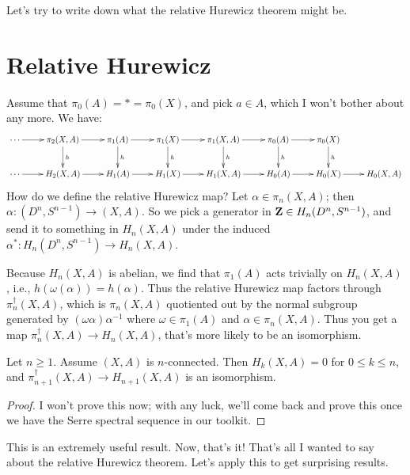 Let's try to write down what the relative Hurewicz theorem might be.
\section{Relative Hurewicz}
    Assume that $\pi_0(A) = \ast = \pi_0(X)$, and pick $a\in A$, which I won't bother about any more. We have:
    \begin{equation*}
	\xymatrix{
	    \cdots\ar[r] & \pi_2(X,A)\ar[r]\ar[d]^h & \pi_1(A)\ar[r]\ar[d]^h & \pi_1(X)\ar[r]\ar[d]^h & \pi_1(X,A)\ar[r]\ar[d]^h & \pi_0(A)\ar[r]\ar[d]^h & \pi_0(X)\ar[d]^h & \\
	    \cdots\ar[r] & H_2(X,A)\ar[r] & H_1(A)\ar[r] & H_1(X)\ar[r] & H_1(X,A)\ar[r] & H_0(A)\ar[r] & H_0(X)\ar[r] & H_0(X,A)
	    }
    \end{equation*}
How do we define the relative Hurewicz map? Let $\alpha\in \pi_n(X,A)$; then $\alpha:(D^n,S^{n-1})\to (X,A)$. So we pick a generator in $\mathbf Z\in H_n(D^n,S^{n-1})$, and send it to something in $H_n(X,A)$ under the induced $\alpha^\ast:H_n(D^n,S^{n-1})\to H_n(X,A)$.

Because $H_n(X,A)$ is abelian, we find that $\pi_1(A)$ acts trivially on $H_n(X,A)$, i.e., $h(\omega(\alpha)) = h(\alpha)$. Thus the relative Hurewicz map factors through $\pi_n^\dagger(X,A)$, which is $\pi_n(X,A)$ quotiented out by the normal subgroup generated by $(\omega\alpha)\alpha^{-1}$ where $\omega\in\pi_1(A)$ and $\alpha\in \pi_n(X,A)$. Thus you get a map $\pi_n^\dagger(X,A)\to H_n(X,A)$, that's more likely to be an isomorphism.
\begin{theorem}
    Let $n\geq 1$. Assume $(X,A)$ is $n$-connected. Then $H_k(X,A) = 0$ for $0\leq k\leq n$, and $\pi_{n+1}^\dagger(X,A)\to H_{n+1}(X,A)$ is an isomorphism.
\end{theorem}
\begin{proof}
I won't prove this now; with any luck, we'll come back and prove this once we have the Serre spectral sequence in our toolkit.
\end{proof}
This is an extremely useful result. Now, that's it! That's all I wanted to say about the relative Hurewicz theorem. Let's apply this to get surprising results.
